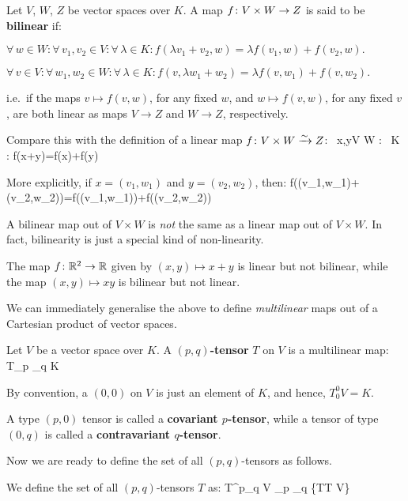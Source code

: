 Let $V$, $W$, $Z$ be vector spaces over $K$. A map $f\colon V\times W \to Z$ is said to be \textbf{bilinear} if:
\bit
\item $\forall \, w\in W:\forall \, v_1,v_2\in V: \forall \,\lambda \in K : f(\lambda v_1+v_2,w)=\lambda f(v_1,w) +
f(v_2,w).$
\item $\forall \, v\in V:\forall \, w_1,w_2\in W: \forall \,\lambda \in K : f(v,\lambda w_1+w_2)=\lambda f(v,w_1) +
f(v,w_2).$
\eit

i.e.\ if the maps $v\mapsto f(v,w)$, for any fixed $w$, and $w\mapsto f(v,w)$, for any fixed $v$, are both linear as
maps $V\to Z$ and $W\to Z$, respectively.
\ed

Compare this with the definition of a linear map $f\colon V\times W \xrightarrow{\sim} Z$:
\bse
\forall \, x,y\in V \times W : \forall \, \lambda \in K : f(\lambda x+y)=\lambda f(x)+f(y)
\ese

More explicitly, if $x=(v_1,w_1)$ and $y = (v_2,w_2)$, then:
\bse
f(\lambda (v_1,w_1)+(v_2,w_2))=\lambda f((v_1,w_1))+f((v_2,w_2))
\ese

A bilinear map out of $V\times W$ is \emph{not} the same as a linear map out of $V\times W$. In fact, bilinearity is
just a special kind of non-linearity.

\be
The map $f\colon \mathbb{R}^2\to \mathbb{R}$ given by $(x,y)\mapsto x+y$ is linear but not bilinear, while the map $(x,y)\mapsto xy$ is
bilinear but not linear.
\ee

We can immediately generalise the above to define \emph{multilinear} maps out of a Cartesian product of vector spaces.

\bd [Tensors]
Let $V$ be a vector space over $K$. A \textbf{$(p,q)$-tensor} $T$ on $V$ is a multilinear map:
\bse
T\cl {}_{p } \times
{}_{q} \to K
\ese
\ed

By convention, a $(0,0)$ on $V$ is just an element of $K$, and hence, $T^0_0 V=K$.

A type $(p,0)$ tensor is called a \textbf{covariant $p$-tensor}, while a tensor of type $(0,q)$ is called a
\textbf{contravariant $q$-tensor}.
\ed

Now we are ready to define the set of all $(p,q)$-tensors as follows.

\bd [$T^p_q V$]
We define the set of all $(p,q)$-tensors $T$ as:
\bse
T^p_q V \coloneqq {}_{p } \otimes {}_{q } \coloneqq \{T\mid T V\}
\ese
\ed

